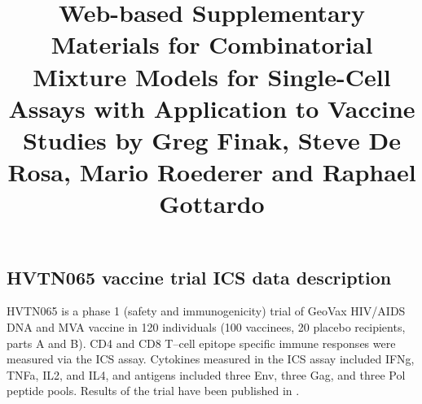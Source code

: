 \documentclass{article}
\title{Web-based Supplementary Materials for Combinatorial Mixture Models for Single-Cell Assays with Application to Vaccine Studies by Greg Finak, Steve De Rosa, Mario Roederer and Raphael Gottardo}
\date{}
\begin{document}
\maketitle
\appendix
\renewcommand{\thesubsection}{Web Appendix \Alph{subsection}:}
\setcounter{subsection}{0}
\renewcommand{\figurename}{\textbf{Web Figure}}
\renewcommand{\thefigure}{\textbf{\Alph{figure}}}
\setcounter{figure}{0}

\section*{}
\subsection{HVTN065 vaccine trial ICS data description}
\label{supp:statpublished}
HVTN065 is a phase 1 (safety and immunogenicity) trial of GeoVax HIV/AIDS DNA and MVA vaccine in 120 individuals (100 vaccinees, 20 placebo recipients, parts A and B). CD4 and CD8 T--cell epitope specific immune responses were measured via the ICS assay. 
Cytokines measured in the ICS assay included IFNg, TNFa, IL2, and IL4, and antigens included three Env, three Gag, and three Pol peptide pools. Results of the trial have been published in \cite{Goonetilleke:2006jk}.

\end{document}
